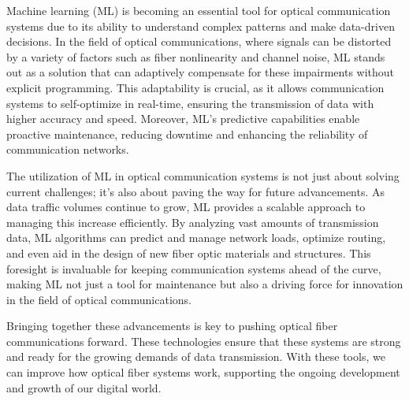 

Machine learning (ML) is becoming an essential tool for optical communication systems due to its ability to understand complex patterns and make data-driven decisions. In the field of optical communications, where signals can be distorted by a variety of factors such as fiber nonlinearity and channel noise, ML stands out as a solution that can adaptively compensate for these impairments without explicit programming. This adaptability is crucial, as it allows communication systems to self-optimize in real-time, ensuring the transmission of data with higher accuracy and speed. Moreover, ML's predictive capabilities enable proactive maintenance, reducing downtime and enhancing the reliability of communication networks.

The utilization of ML in optical communication systems is not just about solving current challenges; it's also about paving the way for future advancements. As data traffic volumes continue to grow, ML provides a scalable approach to managing this increase efficiently. By analyzing vast amounts of transmission data, ML algorithms can predict and manage network loads, optimize routing, and even aid in the design of new fiber optic materials and structures. This foresight is invaluable for keeping communication systems ahead of the curve, making ML not just a tool for maintenance but also a driving force for innovation in the field of optical communications.




Bringing together these advancements is key to pushing optical fiber communications forward. These technologies ensure that these systems are strong and ready for the growing demands of data transmission. With these tools, we can improve how optical fiber systems work, supporting the ongoing development and growth of our digital world.


